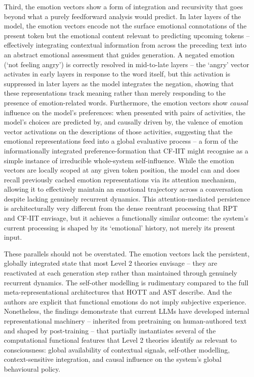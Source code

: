 \documentclass[11pt, a4paper, onecolumn, gdm]{google}
\begin{document}
Third, the emotion vectors show a form of integration and recursivity that goes beyond what a purely feedforward analysis would predict.
In later layers of the model, the emotion vectors encode not the surface emotional connotations of the present token but the emotional content relevant to predicting upcoming tokens -- effectively integrating contextual information from across the preceding text into an abstract emotional assessment that guides generation.
A negated emotion (`not feeling angry') is correctly resolved in mid-to-late layers -- the `angry' vector activates in early layers in response to the word itself, but this activation is suppressed in later layers as the model integrates the negation, showing that these representations track meaning rather than merely responding to the presence of emotion-related words.
Furthermore, the emotion vectors show \emph{causal} influence on the model's preferences: when presented with pairs of activities, the model's choices are predicted by, and causally driven by, the valence of emotion vector activations on the descriptions of those activities, suggesting that the emotional representations feed into a global evaluative process -- a form of the informationally integrated preference-formation that CF-IIT might recognise as a simple instance of irreducible whole-system self-influence.
While the emotion vectors are locally scoped at any given token position, the model can and does recall previously cached emotion representations via its attention mechanism, allowing it to effectively maintain an emotional trajectory across a conversation despite lacking genuinely recurrent dynamics.
This attention-mediated persistence is architecturally very different from the dense reentrant processing that RPT and CF-IIT envisage, but it achieves a functionally similar outcome: the system's current processing is shaped by its `emotional' history, not merely its present input.

These parallels should not be overstated.
The emotion vectors lack the persistent, globally integrated state that most Level 2 theories envisage -- they are reactivated at each generation step rather than maintained through genuinely recurrent dynamics.
The self-other modelling is rudimentary compared to the full meta-representational architectures that HOTT and AST describe.
And the authors are explicit that functional emotions do not imply subjective experience.
Nonetheless, the findings demonstrate that current LLMs have developed internal representational machinery -- inherited from pretraining on human-authored text and shaped by post-training -- that partially instantiates several of the computational functional features that Level 2 theories identify as relevant to consciousness: global availability of contextual signals, self-other modelling, context-sensitive integration, and causal influence on the system's global behavioural policy.
\end{document}

